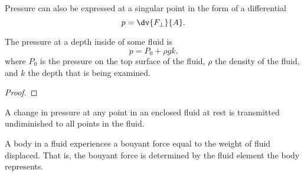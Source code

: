 \documentclass[../notes.tex]{subfiles}
\begin{document}
Pressure can also be expressed at a singular point in the form of a differential
\[
    p = \dv{F_{\perp}}{A}
.\]

\begin{theorem}
    The pressure at a depth inside of some fluid is
    \[
        \boxed{
        p = P_0 + \rho g k
        }
    .\]
    where $P_0$ is the pressure on the top surface of the fluid, $\rho$ the density of the fluid, and $k$ the depth that is being examined.
\end{theorem}

\begin{proof}
\end{proof}

\begin{theorem}
    \label{thm:pascals}
    A change in pressure at any point in an enclosed fluid at rest is transmitted undiminished to all points in the fluid.
\end{theorem}

\begin{theorem}
    \label{thm:archimedes}
    A body in a fluid experiences a bouyant force equal to the weight of fluid displaced. That is, the bouyant force is determined by the fluid element the body represents.
\end{theorem}
\end{document}
